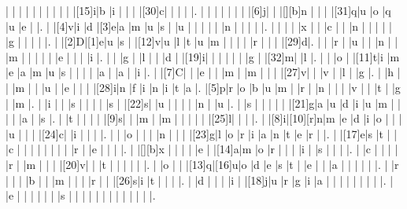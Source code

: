 \documentclass[12pt]{article}
\begin{document}
\begin{Puzzle}{22}{24}
  |{}  |{}  |{}  |{}  |{}  |{}  |{}  |{}  |{}  |{}  |[15]i|b   |i   |{}  |{}  |{}  |[30]c|{}  |{}  |{}  |{}  |.
  |{}  |{}  |{}  |{}  |{}  |{}  |{}  |[6]j|{}  |{}  |[][b]n   |{}  |{}  |{}  |[31]q|u   |o   |q   |u   |e   |{}  |.
  |{}  |[4]v|i   |d   |[3]e|a   |m   |u   |s   |{}  |u   |{}  |{}  |{}  |{}  |{}  |n   |{}  |{}  |{}  |{}  |.
  |{}  |{}  |{}  |{}  |x   |{}  |{}  |c   |{}  |{}  |n   |{}  |{}  |{}  |{}  |{}  |g   |{}  |{}  |{}  |{}  |.
  |{}  |[2]D|[1]e|u   |s   |{}  |[12]v|u   |l   |t   |u   |m   |{}  |{}  |{}  |{}  |r   |{}  |{}  |{}  |[29]d|.
  |{}  |{}  |r   |{}  |u   |{}  |{}  |n   |{}  |{}  |m   |{}  |{}  |{}  |{}  |{}  |e   |{}  |{}  |{}  |i   |.
  |{}  |{}  |g   |{}  |l   |{}  |{}  |d   |{}  |[19]i|{}  |{}  |{}  |{}  |{}  |{}  |g   |{}  |[32]m|{}  |l   |.
  |{}  |{}  |o   |{}  |[11]t|i   |m   |e   |a   |m   |u   |s   |{}  |{}  |{}  |{}  |a   |{}  |a   |{}  |i   |.
  |{}  |[7]C|{}  |{}  |e   |{}  |{}  |m   |{}  |m   |{}  |{}  |{}  |[27]v|{}  |{}  |v   |{}  |l   |{}  |g   |.
  |{}  |h   |{}  |{}  |m   |{}  |{}  |u   |{}  |e   |{}  |{}  |{}  |[28]i|n   |f   |i   |n   |i   |t   |a   |.
  |[5]p|r   |o   |b   |u   |m   |{}  |r   |{}  |n   |{}  |{}  |{}  |v   |{}  |{}  |t   |{}  |g   |{}  |m   |.
  |{}  |i   |{}  |{}  |s   |{}  |{}  |{}  |{}  |s   |{}  |[22]s|{}  |u   |{}  |{}  |{}  |{}  |n   |{}  |u   |.
  |{}  |s   |{}  |{}  |{}  |{}  |{}  |[21]g|a   |u   |d   |i   |u   |m   |{}  |{}  |{}  |{}  |a   |{}  |s   |.
  |{}  |t   |{}  |{}  |{}  |{}  |[9]s|{}  |{}  |m   |{}  |m   |{}  |{}  |{}  |{}  |{}  |[25]l|{}  |{}  |{}  |.
  |{}  |[8]i|[10][r]n|m   |e   |d   |i   |o   |{}  |{}  |{}  |u   |{}  |{}  |{}  |[24]c|{}  |i   |{}  |{}  |{}  |.
  |{}  |{}  |o   |{}  |{}  |{}  |n   |{}  |{}  |{}  |[23]g|l   |o   |r   |i   |a   |n   |t   |e   |r   |{}  |.
  |{}  |[17]e|s   |t   |{}  |{}  |c   |{}  |{}  |{}  |{}  |{}  |{}  |{}  |{}  |r   |{}  |e   |{}  |{}  |{}  |.
  |{}  |[][b]x   |{}  |{}  |{}  |{}  |e   |{}  |[14]a|m   |o   |r   |{}  |{}  |{}  |i   |{}  |s   |{}  |{}  |{}  |.
  |{}  |c   |{}  |{}  |{}  |{}  |r   |{}  |m   |{}  |{}  |{}  |[20]v|{}  |{}  |t   |{}  |{}  |{}  |{}  |{}  |.
  |{}  |o   |{}  |{}  |[13]q|[16]u|o   |d   |e   |s   |t   |{}  |e   |{}  |{}  |a   |{}  |{}  |{}  |{}  |{}  |.
  |{}  |r   |{}  |{}  |{}  |b   |{}  |{}  |m   |{}  |{}  |{}  |r   |{}  |{}  |[26]s|i   |t   |{}  |{}  |{}  |.
  |{}  |d   |{}  |{}  |{}  |i   |{}  |[18]j|u   |r   |g   |i   |a   |{}  |{}  |{}  |{}  |{}  |{}  |{}  |{}  |.
  |{}  |e   |{}  |{}  |{}  |{}  |{}  |{}  |s   |{}  |{}  |{}  |{}  |{}  |{}  |{}  |{}  |{}  |{}  |{}  |{}  |.
\end{Puzzle}
\end{document}
